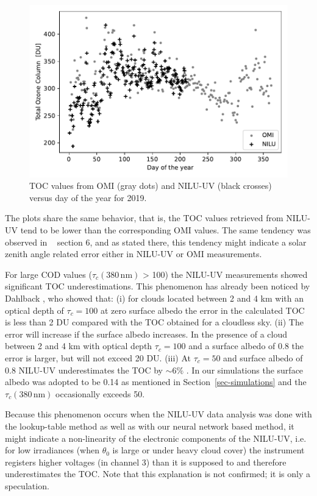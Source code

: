 \documentclass{optica-article}
\begin{document}
\begin{figure}[H]
	\centering
	\includegraphics[width=0.7\linewidth]{OMI_L3_NILU_O3_2019}
	\caption{TOC values from OMI (gray dots) and NILU-UV (black crosses) versus day of the year for 2019.}
	\label{fig:omil3niluo32019}
\end{figure}

The plots share the same behavior, that is, the TOC values retrieved from NILU-UV tend to be lower than the corresponding OMI values. 
The same tendency was observed in ~\cite{Sztipanov:20} section 6, and as stated there, this tendency might indicate a solar zenith angle related error either in NILU-UV or OMI measurements.

For large COD values ($\tau_c{\scriptstyle(380 \, \text{nm})}$ > 100) the NILU-UV measurements showed significant TOC underestimations.
This phenomenon has already been noticed by Dahlback \cite{Dahlback:1996}, who showed that: 
(i) for clouds located between 2 and 4 km with an optical depth of $\tau_c=100$ at zero surface albedo the error in the calculated TOC is less than 2 DU compared with the TOC obtained for a cloudless sky. 
(ii) The error will increase if the surface albedo increases. In the presence of a cloud between 2 and 4 km with optical depth 
$\tau_c=100$ and a surface albedo of 0.8 the error is larger, but will not exceed 20 DU. 
(iii) At $\tau_c=50$ and surface albedo of 0.8 NILU-UV underestimates the TOC by $\sim 6\%$ \cite{Dahlback:2003}. 
In our simulations the surface albedo was adopted to be 0.14 as mentioned in Section~\ref{sec-simulations} and the $\tau_c{\scriptstyle(380 \, \text{nm})}$ occasionally exceeds 50.

Because this phenomenon occurs when the NILU-UV data analysis was done with the lookup-table method as well as with our neural network based method, it might indicate a non-linearity of the electronic components of the NILU-UV, i.e. for low irradiances (when $\theta_0$ is large or under heavy cloud cover) the instrument registers higher voltages (in channel 3) than 
it is supposed to and therefore underestimates the TOC. 
Note that this explanation is not confirmed; it is only a speculation. 
\end{document}
